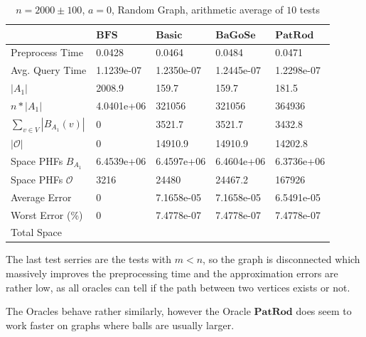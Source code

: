 \documentclass[shortabstract, lic, english]{iithesis}
\theoremstyle{definition} \newtheorem{definition}{Definition}[chapter]
\theoremstyle{remark} \newtheorem{remark}[definition]{Observation}
\theoremstyle{plain} \newtheorem{theorem}[definition]{Theorem}
\theoremstyle{plain} \newtheorem{lemma}[definition]{Lemma}
\theoremstyle{plain} \newtheorem{conjecture}[definition]{Conjecture}
\begin{document}
\begin{table}[H] \label{test:random.a0}
    \centering
    \begin{tabular}{ |p{3cm}||p{2cm}|p{2cm}|p{2cm}|p{2cm}|  } 
        \hline
        & $\mathbf{BFS}$ & $\mathbf{Basic}$ & $\mathbf{BaGoSe}$ & $\mathbf{PatRod}$ \\
        \hline
        \hline
        Preprocess Time                 & 0.0428     & 0.0464     & 0.0484      & 0.0471     \\
        \hline
        Avg. Query Time                 & 1.1239e-07 & 1.2350e-07 & 1.2445e-07  & 1.2298e-07 \\
        \hline
        $|A_1|$                         & 2008.9     & 159.7      & 159.7       & 181.5      \\
        \hline
        $n * |A_1|$                     & 4.0401e+06 & 321056     & 321056      & 364936     \\
        \hline
        $\sum_{v \in V} |B_{A_1}(v)| $  & 0          & 3521.7     & 3521.7      & 3432.8     \\
        \hline
        $|\mathcal{O}|$                 & 0          & 14910.9    & 14910.9     & 14202.8    \\
        \hline
        Space PHFs $B_{A_1}$            & 6.4539e+06 & 6.4597e+06 & 6.4604e+06  & 6.3736e+06 \\
        \hline
        Space PHFs $\mathcal{O}$        & 3216       & 24480      & 24467.2     & 167926     \\
        \hline
        Average Error                   & 0          & 7.1658e-05 & 7.1658e-05  & 6.5491e-05 \\
        \hline
        Worst Error (\%)                & 0          & 7.4778e-07 & 7.4778e-07  & 7.4778e-07 \\
        \hline
        Total Space                     &            &            &             &            \\
        \hline

    \end{tabular}
    \caption{$n = 2000 \pm 100$, $a = 0$, Random Graph, arithmetic average of $10$ tests}
\end{table}

The last test serries are the tests with $m < n$, so the graph is disconnected which massively improves the preprocessing time and the approximation errors are rather low,
as all oracles can tell if the path between two vertices exists or not.


The Oracles behave rather similarly, however the Oracle $\mathbf{PatRod}$ does seem to work faster on graphs where balls are usually larger.
\end{document}
